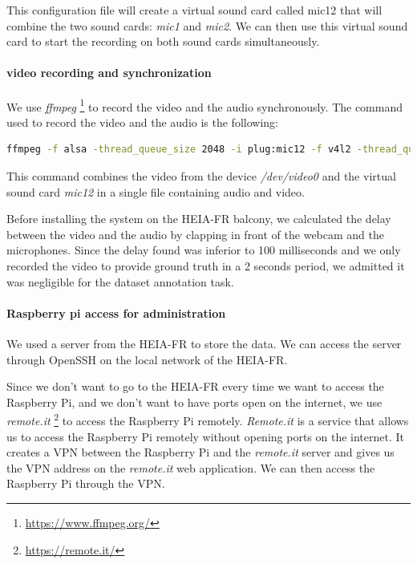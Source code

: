 This configuration file will create a virtual sound card called mic12 that will combine the two sound cards: \textit{mic1} and \textit{mic2}. We can then use this virtual sound card to start the recording on both sound cards simultaneously.

\paragraph{video recording and synchronization}

We use \textit{ffmpeg} \footnote{\url{https://www.ffmpeg.org/}} to record the video and the audio synchronously. The command used to record the video and the audio is the following:

\begin{lstlisting}[language=bash]
    ffmpeg -f alsa -thread_queue_size 2048 -i plug:mic12 -f v4l2 -thread_queue_size 2048 -input_format mjpeg -video_size 600x400 -i /dev/video0 -c:a aac -map 0:a -map 1:v -segment_time 00:10:00 -f segment /mnt/videos/$current_date/output%05d.mp4
\end{lstlisting}

This command combines the video from the device \textit{/dev/video0} and the virtual sound card \textit{mic12} in a single file containing audio and video.

Before installing the system on the HEIA-FR balcony, we calculated the delay between the video and the audio by clapping in front of the webcam and the microphones. Since the delay found was inferior to 100 milliseconds and we only recorded the video to provide ground truth in a 2 seconds period, we admitted it was negligible for the dataset annotation task.

\paragraph{Raspberry pi access for administration}

We used a server from the HEIA-FR to store the data. We can access the server through OpenSSH on the local network of the HEIA-FR.

Since we don't want to go to the HEIA-FR every time we want to access the Raspberry Pi, and we don't want to have ports open on the internet, we use \textit{remote.it} \footnote{\url{https://remote.it/}} to access the Raspberry Pi remotely. \textit{Remote.it} is a service that allows us to access the Raspberry Pi remotely without opening ports on the internet. It creates a VPN between the Raspberry Pi and the \textit{remote.it} server and gives us the VPN address on the \textit{remote.it} web application. We can then access the Raspberry Pi through the VPN.


